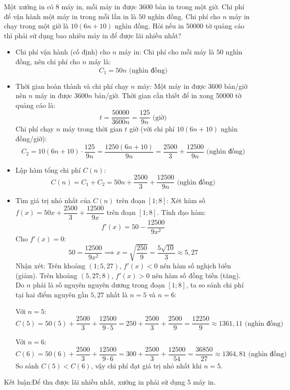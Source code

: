 \begin{baitap}
	Một xưởng in có $8$ máy in, mỗi máy in được \num{3600} bản in trong một giờ. Chi phí để vận hành một máy in trong mỗi lần in là $50$ nghìn đồng. Chi phí cho $n$ máy in chạy trong một giờ là $10(6n + 10)$ nghìn đồng. Hỏi nếu in \num{50000} tờ quảng cáo thì phải sử dụng bao nhiêu máy in để được lãi nhiều nhất?
	\begin{traloi}
		\begin{itemize}
			\item Chi phí vận hành (cố định) cho $n$ máy in: Chi phí cho mỗi máy là $50$ nghìn đồng, nên chi phí cho $n$ máy là:$$C_1 = 50n \text{ (nghìn đồng)}$$
			\item Thời gian hoàn thành và chi phí chạy $n$ máy: Một máy in được $3600$ bản/giờ nên $n$ máy in được $3600n$ bản/giờ. Thời gian cần thiết để in xong \num{50000} tờ quảng cáo là:$$t = \dfrac{50000}{3600n} = \dfrac{125}{9n} \text{ (giờ)}$$Chi phí chạy $n$ máy trong thời gian $t$ giờ (với chi phí $10(6n + 10)$ nghìn đồng/giờ):$$C_2 = 10(6n + 10) \cdot \dfrac{125}{9n} = \dfrac{1250(6n + 10)}{9n} = \dfrac{2500}{3} + \dfrac{12500}{9n} \text{ (nghìn đồng)}$$
			\item Lập hàm tổng chi phí $C(n)$:$$C(n) = C_1 + C_2 = 50n + \dfrac{2500}{3} + \dfrac{12500}{9n} \text{ (nghìn đồng)}$$
			\item Tìm giá trị nhỏ nhất của $C(n)$ trên đoạn $[1; 8]$: Xét hàm số $f(x) = 50x + \dfrac{2500}{3} + \dfrac{12500}{9x}$ trên đoạn $[1; 8]$. Tính đạo hàm:$$f'(x) = 50 - \dfrac{12500}{9x^2}$$ Cho $f'(x) = 0$:$$50 = \dfrac{12500}{9x^2} \implies x = \sqrt{\dfrac{250}{9}} = \dfrac{5\sqrt{10}}{3} \approx 5{,}27$$Nhận xét: Trên khoảng $(1; 5{,}27)$, $f'(x) < 0$ nên hàm số nghịch biến (giảm). Trên khoảng $(5{,}27; 8)$, $f'(x) > 0$ nên hàm số đồng biến (tăng). Do $n$ phải là số nguyên nguyên dương trong đoạn $[1; 8]$, ta so sánh chi phí tại hai điểm nguyên gần $5{,}27$ nhất là $n = 5$ và $n = 6$:
			
			Với $n = 5$:$$C(5) = 50(5) + \dfrac{2500}{3} + \dfrac{12500}{9 \cdot 5} = 250 + \dfrac{2500}{3} + \dfrac{2500}{9} = \dfrac{12250}{9} \approx 1361{,}11 \text{ (nghìn đồng)}$$
			
			Với $n = 6$:$$C(6) = 50(6) + \dfrac{2500}{3} + \dfrac{12500}{9 \cdot 6} = 300 + \dfrac{2500}{3} + \dfrac{12500}{54} = \dfrac{36850}{27} \approx 1364{,}81 \text{ (nghìn đồng)}$$
			So sánh $C(5) < C(6)$, vậy chi phí đạt giá trị nhỏ nhất khi $n = 5$.
		\end{itemize}
		Kết luận:Để thu được lãi nhiều nhất, xưởng in phải sử dụng $5$ máy in.
	\end{traloi}
\end{baitap}

